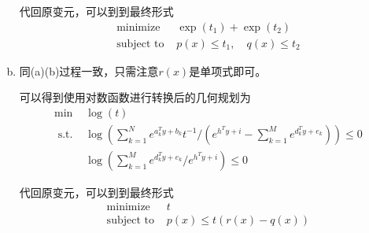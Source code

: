 \documentclass[10pt, a4paper]{article}
\begin{document}
\begin{enumerate}[(a)]
    代回原变元，可以到到最终形式
    $$
    \begin{array}{ll}
    \operatorname{minimize} & \exp \left(t_{1}\right)+\exp \left(t_{2}\right) \\
    \text {subject to } & p(x) \leq t_{1}, \quad q(x) \leq t_{2}
    \end{array}
    $$
    \item 同(a)(b)过程一致，只需注意$r(x)$是单项式即可。
    
    可以得到使用对数函数进行转换后的几何规划为
    $$
    \begin{array}{ll}
    \min & \log (t)\\
    \text { s.t. } & \log \left(\sum_{k=1}^{N} e^{a_{k}^{T} y+b_{k}} t^{-1} /\left(e^{h^{T} y+i}-\sum_{k=1}^{M} e^{d_{k}^{T} y+e_{k}}\right)\right) \leq 0 \\
    & \log \left(\sum_{k=1}^{M} e^{d_{k}^{T} y+e_{k}} / e^{h^{T} y+i}\right) \leq 0
    \end{array}
    $$

    代回原变元，可以到到最终形式
    $$
    \begin{array}{ll}
    \operatorname{minimize} & t \\
    \text {subject to } & p(x) \leq t(r(x)-q(x))
    \end{array}
    $$
\end{enumerate}
\end{document}
